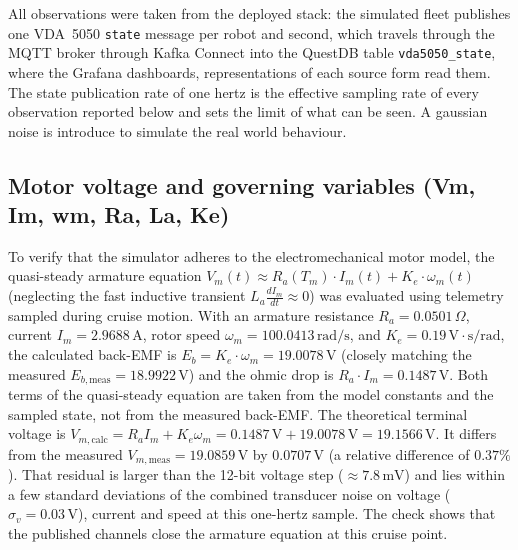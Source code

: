 All observations were taken from the deployed stack: the simulated fleet publishes one
VDA~5050 \texttt{state} message per robot and second, which travels through the MQTT broker
through Kafka Connect into the QuestDB table \texttt{vda5050\_state}, where
the Grafana dashboards, representations of each source form read them. The state publication rate of one hertz is
the effective sampling rate of every observation reported below and sets the limit of
what can be seen.
A gaussian noise is introduce to simulate the real world behaviour.

\subsection{Motor voltage and governing variables (Vm, Im, wm, Ra, La, Ke)}
To verify that the simulator adheres to the electromechanical motor model, the quasi-steady armature equation $V_m(t) \approx R_a(T_m) \cdot I_m(t) + K_e \cdot \omega_m(t)$ (neglecting the fast inductive transient $L_a \frac{dI_m}{dt} \approx 0$) was evaluated using telemetry sampled during cruise motion. With an armature resistance $R_a = 0.0501\,\Omega$, current $I_m = 2.9688\,\text{A}$, rotor speed $\omega_m = 100.0413\,\text{rad/s}$, and $K_e = 0.19\,\text{V}\cdot\text{s/rad}$, the calculated back-EMF is $E_b = K_e \cdot \omega_m = 19.0078\,\text{V}$ (closely matching the measured $E_{b,\text{meas}} = 18.9922\,\text{V}$) and the ohmic drop is $R_a \cdot I_m = 0.1487\,\text{V}$. Both terms of the quasi-steady equation are taken from the model constants and the sampled state, not from the measured back-EMF. The theoretical terminal voltage is $V_{m,\text{calc}} = R_a I_m + K_e \omega_m = 0.1487\,\text{V} + 19.0078\,\text{V} = 19.1566\,\text{V}$. It differs from the measured $V_{m,\text{meas}} = 19.0859\,\text{V}$ by $0.0707\,\text{V}$ (a relative difference of $0.37\%$). That residual is larger than the 12-bit voltage step ($\approx 7.8\,\text{mV}$) and lies within a few standard deviations of the combined transducer noise on voltage ($\sigma_v = 0.03\,\text{V}$), current and speed at this one-hertz sample. The check shows that the published channels close the armature equation at this cruise point.

